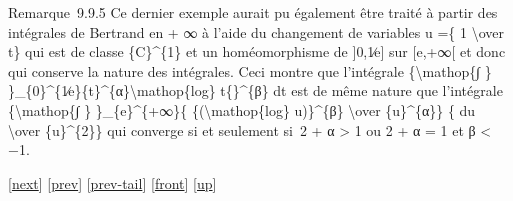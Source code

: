 \documentclass[]{article}
\begin{document}
Remarque~9.9.5 Ce dernier exemple aurait pu également être traité à
partir des intégrales de Bertrand en + ∞ à l'aide du changement de
variables u =\{ 1 \textbackslash{}over t\} qui est de classe
\{C\}\^{}\{1\} et un homéomorphisme de {]}0,1∕e{]} sur {[}e,+∞{[} et
donc qui conserve la nature des intégrales. Ceci montre que l'intégrale
\{\textbackslash{}mathop\{∫ \}
\}\_\{0\}\^{}\{1∕e\}\{t\}\^{}\{α\}\textbar{}\textbackslash{}mathop\{log\}
t\{\textbar{}\}\^{}\{β\} dt est de même nature que l'intégrale
\{\textbackslash{}mathop\{∫ \} \}\_\{e\}\^{}\{+∞\}\{
\{(\textbackslash{}mathop\{log\} u)\}\^{}\{β\} \textbackslash{}over
\{u\}\^{}\{α\}\} \{ du \textbackslash{}over \{u\}\^{}\{2\}\} qui
converge si et seulement si~2 + α \textgreater{} 1 ou 2 + α = 1 et β
\textless{} −1.

{[}\href{coursse59.html}{next}{]} {[}\href{coursse57.html}{prev}{]}
{[}\href{coursse57.html\#tailcoursse57.html}{prev-tail}{]}
{[}\href{coursse58.html}{front}{]}
{[}\href{coursch10.html\#coursse58.html}{up}{]}
\end{document}
